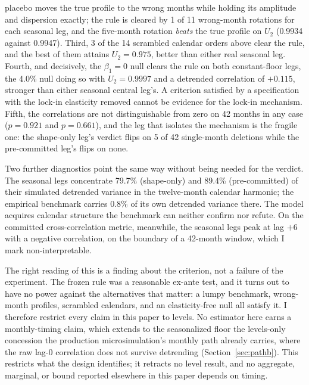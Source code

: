 \documentclass[12pt]{article}
\begin{document}
placebo moves the true profile to the wrong months while holding its amplitude and dispersion exactly; the rule is cleared by 1 of 11 wrong-month rotations for each seasonal leg, and the five-month rotation \emph{beats} the true profile on $U_2$ (0.9934 against 0.9947). Third, 3 of the 14 scrambled calendar orders above clear the rule, and the best of them attains $U_2 = 0.975$, better than either real seasonal leg. Fourth, and decisively, the $\beta_1 = 0$ null clears the rule on both constant-floor legs, the 4.0\% null doing so with $U_2 = 0.9997$ and a detrended correlation of $+0.115$, stronger than either seasonal central leg's. A criterion satisfied by a specification with the lock-in elasticity removed cannot be evidence for the lock-in mechanism. Fifth, the correlations are not distinguishable from zero on 42 months in any case ($p = 0.921$ and $p = 0.661$), and the leg that isolates the mechanism is the fragile one: the shape-only leg's verdict flips on 5 of 42 single-month deletions while the pre-committed leg's flips on none.

Two further diagnostics point the same way without being needed for the verdict. The seasonal legs concentrate 79.7\% (shape-only) and 89.4\% (pre-committed) of their simulated detrended variance in the twelve-month calendar harmonic; the empirical benchmark carries 0.8\% of its own detrended variance there. The model acquires calendar structure the benchmark can neither confirm nor refute. On the committed cross-correlation metric, meanwhile, the seasonal legs peak at lag $+6$ with a negative correlation, on the boundary of a 42-month window, which I mark non-interpretable.

The right reading of this is a finding about the criterion, not a failure of the experiment. The frozen rule was a reasonable ex-ante test, and it turns out to have no power against the alternatives that matter: a lumpy benchmark, wrong-month profiles, scrambled calendars, and an elasticity-free null all satisfy it. I therefore restrict every claim in this paper to levels. No estimator here earns a monthly-timing claim, which extends to the seasonalized floor the levels-only concession the production microsimulation's monthly path already carries, where the raw lag-0 correlation does not survive detrending (Section~\ref{sec:pathb}). This restricts what the design identifies; it retracts no level result, and no aggregate, marginal, or bound reported elsewhere in this paper depends on timing.
\end{document}
